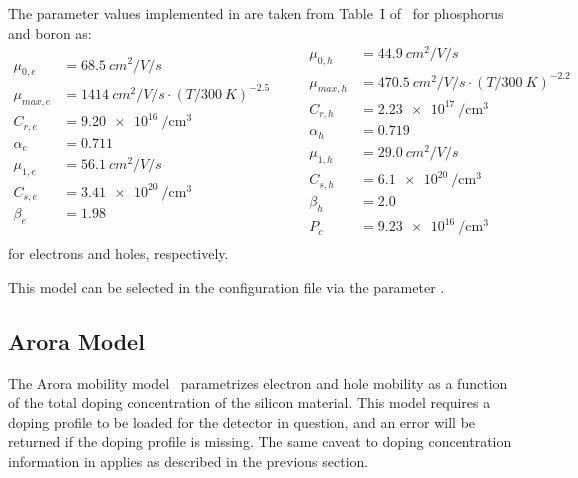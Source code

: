 The parameter values implemented in \apsq are taken from Table~I of~\cite{masetti} for phosphorus and boron as:
\begin{equation*}
    \begin{split}
        \mu_{0,e}   &= \SI{68.5}{cm^2 \per V \per s}\\
        \mu_{max,e} &= \SI{1414}{cm^2 \per V \per s} \cdot (T / \SI{300}{K})^{-2.5}\\
        C_{r,e}     &= \SI{9.20e16}{\per \cubic \cm}\\
        \alpha_{e}  &= 0.711\\
        \mu_{1,e}   &= \SI{56.1}{cm^2 \per V \per s}\\
        C_{s,e}     &= \SI{3.41e20}{\per \cubic \cm}\\
        \beta_{e}   &= 1.98\\
    \end{split}
    \qquad
    \begin{split}
        \mu_{0,h}   &= \SI{44.9}{cm^2 \per V \per s}\\
        \mu_{max,h} &= \SI{470.5}{cm^2 \per V \per s} \cdot (T / \SI{300}{K})^{-2.2}\\
        C_{r,h}     &= \SI{2.23e17}{\per \cubic \cm}\\
        \alpha_{h}  &= 0.719\\
        \mu_{1,h}   &= \SI{29.0}{cm^2 \per V \per s}\\
        C_{s,h}     &= \SI{6.1e20}{\per \cubic \cm}\\
        \beta_{h}   &= 2.0\\
        P_{c}       &= \SI{9.23e16}{\per \cubic \cm}\\
    \end{split}
\end{equation*}
for electrons and holes, respectively.

This model can be selected in the configuration file via the parameter .


\subsection{Arora Model}

The Arora mobility model~\cite{arora} parametrizes electron and hole mobility as a function of the total doping concentration of the silicon material.
This model requires a doping profile to be loaded for the detector in question, and an error will be returned if the doping profile is missing.
The same caveat to doping concentration information in \apsq applies as described in the previous section.

